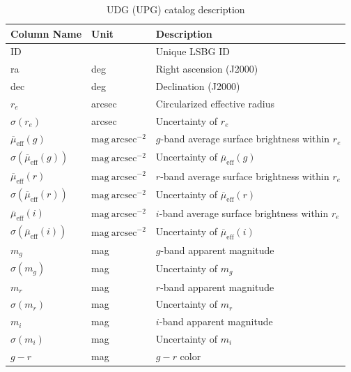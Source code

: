 \documentclass[twocolumn,astrosymb,twocolappendix]{aastex631}
\newcommand{\sbunit}{\mathrm{mag\ arcsec}^{-2}}
\begin{document}
\begin{CJK*}{UTF8}{gbsn}
\begin{table}
\caption{UDG (UPG) catalog description} 
\label{tab:catalog}
\begin{center}
\begin{tabular}{l l l}
\hline\hline
Column Name      & Unit    & Description                    \\
\hline
ID                       &         & Unique LSBG ID \\
ra                       & deg     & Right ascension (J2000) \\
dec                      & deg     & Declination (J2000) \\
$r_e$         & arcsec  & Circularized effective radius  \\
$\sigma(r_e)$ & arcsec  & Uncertainty of $r_e$ \\
$\overline{\mu}_{\mathrm{eff}}(g)$               & $\sbunit$ & $g$-band average surface brightness within $r_e$ \\
$\sigma(\overline{\mu}_{\mathrm{eff}}(g))$       & $\sbunit$ & Uncertainty of $\overline{\mu}_{\mathrm{eff}}(g)$           \\
$\overline{\mu}_{\mathrm{eff}}(r)$               & $\sbunit$ & $r$-band average surface brightness within $r_e$ \\
$\sigma(\overline{\mu}_{\mathrm{eff}}(r))$       & $\sbunit$ & Uncertainty of $\overline{\mu}_{\mathrm{eff}}(r)$           \\
$\overline{\mu}_{\mathrm{eff}}(i)$               & $\sbunit$ & $i$-band average surface brightness within $r_e$ \\
$\sigma(\overline{\mu}_{\mathrm{eff}}(i))$       & $\sbunit$ & Uncertainty of $\overline{\mu}_{\mathrm{eff}}(i)$           \\
$m_g$                    & mag     & $g$-band apparent magnitude     \\
$\sigma(m_g)$            & mag     & Uncertainty of $m_g$            \\
$m_r$                    & mag     & $r$-band apparent magnitude     \\
$\sigma(m_r)$            & mag     & Uncertainty of $m_r$            \\
$m_i$                    & mag     & $i$-band apparent magnitude     \\
$\sigma(m_i)$            & mag     & Uncertainty of $m_i$            \\
$g-r$                    & mag     & $g-r$ color                     \\

\end{tabular}
\end{center}
\end{table}
\end{CJK*}
\end{document}
